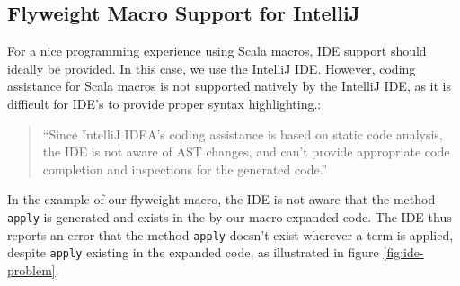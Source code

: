 \documentclass[11pt]{article}
\begin{document}





    \subsection{Flyweight Macro Support for IntelliJ} \label{macro-support-intellij}

    For a nice programming experience
    using Scala macros, IDE support should ideally be provided. In this case, we use the IntelliJ IDE.
    However, coding assistance for Scala macros is not supported natively by the IntelliJ IDE, 
    as it is difficult for IDE's to provide proper syntax highlighting.:

    \begin{quote}
        ``Since IntelliJ IDEA’s coding assistance is based on static code analysis,
        the IDE is not aware of AST changes, and can’t provide appropriate code
        completion and inspections for the generated code.'' \cite{intellij}
    \end{quote}

    In the example of our flyweight macro, the IDE is not aware that
    the method \texttt{apply} is generated and exists in the by our macro
    expanded code. The IDE thus reports an error that the method \texttt{apply}
    doesn't exist
    wherever a term is applied, despite \texttt{apply} existing in the expanded code, as illustrated in figure \ref{fig:ide-problem}.
\end{document}
